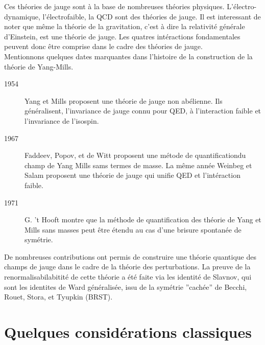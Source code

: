 \documentclass[a4paper,11pt]{article}
\theoremstyle{plain}
\theoremstyle{definition}
\theoremstyle{remark}
\numberwithin{equation}{section}
\numberwithin{equation}{subsection}
\numberwithin{figure}{section}
\begin{document}
Ces théories de jauge sont à la base de nombreuses théories physiques. L'électro-dynamique, l'électrofaible, la QCD sont des théories de jauge. Il est interessant de noter que même la théorie de la gravitation, c'est à dire la relativité générale d'Einstein, est une théorie de jauge. Les quatres intéractions fondamentales peuvent donc être comprise dans le cadre des théories de jauge. \\

Mentionnons quelques dates marquantes dans l'histoire de la construction de la théorie de Yang-Mills.
\begin{description}
 \item[1954] Yang et Mills proposent une théorie de jauge non abélienne. Ils généralisent, l'invariance de jauge connu pour QED, à l'interaction faible et l'invariance de l'isospin.
 \item[1967] Faddeev, Popov, et de Witt proposent une métode de quantificationdu champ de Yang Mills sams termes de masse. La même année Weinbeg et Salam proposent une théorie de jauge qui unifie QED et l'intéraction faible.
 \item[1971] G. 't Hooft montre que la méthode de quantification des théorie de Yang et Mills sans masses peut être étendu au cas d'une brisure spontanée de symétrie.
\end{description}

De nombreuses contributions ont permis de construire une théorie quantique des champs de jauge dans le cadre de la théorie des perturbations. La preuve de la renormalisabilabitité de cette théorie a été faite via les identité de Slavnov, qui sont les identites de Ward généralisée, issu de la symétrie ''cachée'' de Becchi, Rouet, Stora, et Tyupkin (BRST). \\

 \section{Quelques considérations classiques}
\end{document}
